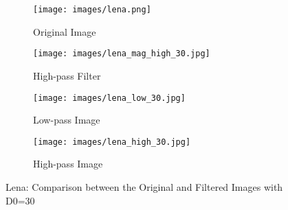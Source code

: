 \begin{figure}[htbp]
    \centering 
    \begin{minipage}{0.8\textwidth} 
        \centering 
        
        \begin{subfigure}[b]{0.45\linewidth} 
            \texttt{[image: images/lena.png]}
            \caption{Original Image}
        \end{subfigure}
        \hfill
        \begin{subfigure}[b]{0.45\linewidth}
            \texttt{[image: images/lena\_mag\_high\_30.jpg]}
            \caption{High-pass Filter}
        \end{subfigure}

        \vspace{0.5cm}
        \begin{subfigure}[b]{0.45\linewidth}
            \texttt{[image: images/lena\_low\_30.jpg]}
            \caption{Low-pass Image}
        \end{subfigure}
        \hfill
        \begin{subfigure}[b]{0.45\linewidth}
            \texttt{[image: images/lena\_high\_30.jpg]}
            \caption{High-pass Image}
        \end{subfigure}

        \caption{Lena: Comparison between the Original and Filtered Images with D0=30}
        \label{fig:lena_2}
    \end{minipage}
\end{figure}

